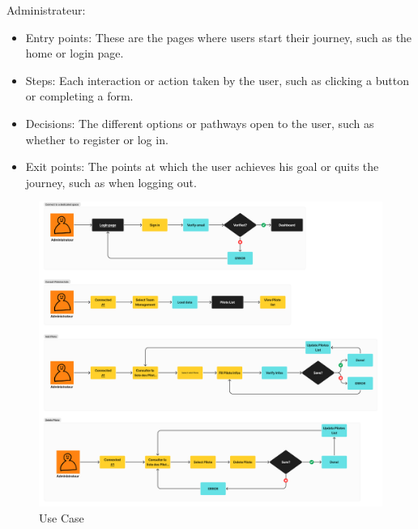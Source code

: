 \begin{description}\item[Administrateur:]\end{description} 
\begin{itemize}
  \item Entry points: These are the pages where users start their journey, such as the home or login page.
  \item Steps: Each interaction or action taken by the user, such as clicking a button or completing a form.
  \item Decisions: The different options or pathways open to the user, such as whether to register or log in.
  \item Exit points: The points at which the user achieves his goal or quits the journey, such as when logging out.
\end{itemize}
\begin{figure}[H]
    \centering
    \includegraphics[width=1\textwidth]{chapters/2/img/2.png}
    \caption{Use Case}
    \label{fig:campus}
\end{figure}


